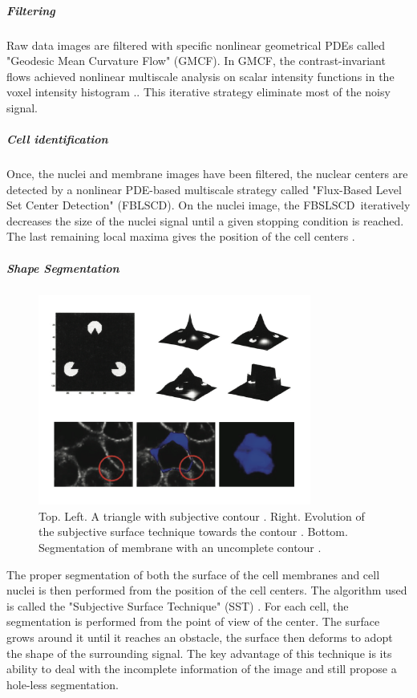 \subparagraph{Filtering}

  Raw data images are filtered with specific nonlinear geometrical PDEs called "Geodesic Mean Curvature Flow" (GMCF). In GMCF, the contrast-invariant flows achieved nonlinear multiscale analysis on scalar intensity functions in the voxel intensity histogram \cite{Rizzi:2007bz}\cite{Kriva:2010cs}.. This iterative strategy eliminate most of the noisy signal. 

\subparagraph{Cell identification}

  Once, the nuclei and membrane images have been filtered, the nuclear centers are detected by a nonlinear PDE-based multiscale strategy called "Flux-Based Level Set Center Detection" (FBLSCD). On the nuclei image, the FBSLSCD iteratively decreases the size of the nuclei signal until a given stopping condition is reached. The last remaining local maxima gives the position of the cell centers \cite{Frolkovic:2007ti}. 

\subparagraph{Shape Segmentation}
\begin{figure}
\begin{center}
\includegraphics[width=0.8\textwidth]{../../images/Reconstruction/bioemergences/segmentation/images_segmentation.png}
\end{center}
\caption{Top. Left. A triangle with subjective contour \cite{Sarti:2000jw}. Right. Evolution of the subjective surface technique towards the contour \cite{Sarti:2000jw}. Bottom. Segmentation of membrane with an uncomplete contour \cite{Zanella:2007vh}.}
\label{segmentation_images_segmentation}
\end{figure}

  The proper segmentation of both the surface of the cell membranes and cell nuclei is then performed from the position of the cell centers. The algorithm used is called the "Subjective Surface Technique" (SST) \cite{Sarti:2000jw}. For each cell, the segmentation is performed from the point of view of the center. The surface grows around it until it reaches an obstacle, the surface then deforms to adopt the shape of the surrounding signal. The key advantage of this technique is its ability to deal with the incomplete information of the image and still propose a hole-less segmentation.  

